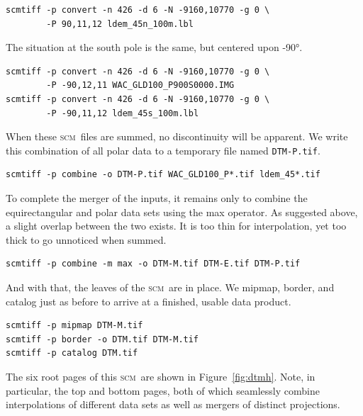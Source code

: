 \documentclass[oneside,10pt]{memoir}
\newcommand{\scm}     {\textsc{scm}}
\begin{document}
\begin{Spacing}{1.1}
\begin{Verbatim}
scmtiff -p convert -n 426 -d 6 -N -9160,10770 -g 0 \
        -P 90,11,12 ldem_45n_100m.lbl
\end{Verbatim}

The situation at the south pole is the same, but centered upon \ang{-90}.

\begin{Verbatim}
scmtiff -p convert -n 426 -d 6 -N -9160,10770 -g 0 \
        -P -90,12,11 WAC_GLD100_P900S0000.IMG
scmtiff -p convert -n 426 -d 6 -N -9160,10770 -g 0 \
        -P -90,11,12 ldem_45s_100m.lbl
\end{Verbatim}

When these \scm\ files are summed, no discontinuity will be apparent. We write this combination of all polar data to a temporary file named \texttt{DTM-P.tif}.

\begin{Verbatim}
scmtiff -p combine -o DTM-P.tif WAC_GLD100_P*.tif ldem_45*.tif
\end{Verbatim}

To complete the merger of the inputs, it remains only to combine the equirectangular and polar data sets using the max operator. As suggested above, a slight overlap between the two exists. It is too thin for interpolation, yet too thick to go unnoticed when summed.

\begin{Verbatim}
scmtiff -p combine -m max -o DTM-M.tif DTM-E.tif DTM-P.tif
\end{Verbatim}

And with that, the leaves of the \scm\ are in place. We mipmap, border, and catalog just as before to arrive at a finished, usable data product.

\begin{Verbatim}
scmtiff -p mipmap DTM-M.tif
scmtiff -p border -o DTM.tif DTM-M.tif
scmtiff -p catalog DTM.tif
\end{Verbatim}

The six root pages of this \scm\ are shown in Figure~\ref{fig:dtmh}. Note, in particular, the top and bottom pages, both of which seamlessly combine interpolations of different data sets as well as mergers of distinct projections.


\end{Spacing}
\end{document}
